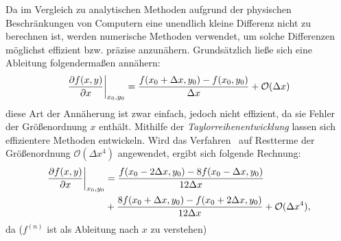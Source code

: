 \label{sec:abl_approx}

Da im Vergleich zu analytischen Methoden aufgrund der physischen Beschränkungen von Computern eine unendlich kleine Differenz nicht zu berechnen ist, werden numerische Methoden verwendet, um solche Differenzen möglichst effizient bzw. präzise anzunähern.
Grundsätzlich ließe sich eine Ableitung folgendermaßen annähern:
\begin{align*}
    \left.\frac{\partial f(x,y)}{\partial x}\right\vert_{x_0 , y_0} = \frac{f(x_0 +\Delta x,y_0)-f(x_0,y_0)}{\Delta x} + \mathcal{O}(\Delta x)
\end{align*}
diese Art der Annäherung ist zwar einfach, jedoch nicht effizient, da sie Fehler der Größenordnung $x$ enthält. Mithilfe der \emph{Taylorreihenentwicklung} lassen sich effizientere Methoden entwickeln. Wird das Verfahren~\cite[nach][S. ~51f.]{lecheler_computational_2022} auf Restterme der Größenordnung $\mathcal{O}(\Delta x^4)$ angewendet, ergibt sich folgende Rechnung:
\begin{align}
\label{naeherung4}
\begin{split}
    \left. \frac{\partial f(x,y)}{\partial x} \right\vert_{x_0,y_0} &= \frac{f(x_0-2\Delta x,y_0) - 8 f(x_0 -\Delta x,y_0)}{12\Delta x} \\
    &+ \frac{8f(x_0+\Delta x, y_0) - f(x_0 + 2\Delta x, y_0)}{12\Delta x} + \mathcal{O}(\Delta x^4),
    \end{split}
\end{align}
da ($f^{(n)}$ ist als Ableitung nach $x$ zu verstehen)
